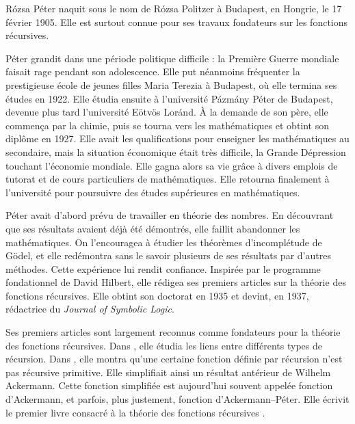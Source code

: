\documentclass[../../../include/open-logic-section]{subfiles}
\begin{document}



R\'ozsa P\'eter
naquit sous
le nom de
R\'ozsa Politzer
à Budapest,
en Hongrie,
le 17 février 1905.
Elle est surtout connue pour ses travaux fondateurs
sur les fonctions récursives.

P\'eter grandit
dans une période
politique difficile :
la Première Guerre
mondiale faisait
rage pendant
son adolescence.
Elle put néanmoins
fréquenter la
prestigieuse école
de jeunes filles
Maria Terezia
à Budapest,
où elle termina
ses études
en 1922.
Elle étudia
ensuite à
l'université
P\'azm\'any P\'eter
de Budapest,
devenue plus tard
l'université
E\"otv\"os Lor\'and.
À la demande
de son père,
elle commença
par la chimie,
puis se tourna
vers les
mathématiques
et obtint
son diplôme
en 1927.
Elle avait
les qualifications
pour enseigner
les mathématiques
au secondaire,
mais la situation
économique était
très difficile,
la Grande Dépression
touchant l'économie
mondiale. Elle
gagna alors
sa vie grâce
à divers emplois
de tutorat
et de cours
particuliers
de mathématiques.
Elle retourna
finalement à
l'université
pour poursuivre
des études
supérieures
en mathématiques.

P\'eter avait
d'abord prévu
de travailler
en théorie
des nombres.
En découvrant
que ses résultats
avaient déjà
été démontrés,
elle faillit
abandonner
les mathématiques.
On l'encouragea
à étudier les
théorèmes
d'incomplétude
de G\"odel,
et elle redémontra
sans le savoir
plusieurs de
ses résultats
par d'autres
méthodes.
Cette expérience
lui rendit
confiance.
Inspirée par
le programme
fondationnel
de David Hilbert,
elle rédigea
ses premiers articles sur la théorie
des fonctions récursives.
Elle obtint
son doctorat
en 1935 et
devint, en 1937,
rédactrice du
\emph{Journal of
Symbolic Logic}.

Ses premiers
articles sont
largement reconnus
comme fondateurs
pour la théorie
des fonctions
récursives.
Dans
\cite{Peter1935a},
elle étudia
les liens
entre différents
types de récursion.
Dans
\cite{Peter1935b},
elle montra
qu'une certaine
fonction définie
par récursion
n'est pas
récursive primitive.
Elle simplifiait
ainsi un résultat
antérieur de
Wilhelm Ackermann.
Cette fonction
simplifiée est
aujourd'hui
souvent appelée
fonction d'Ackermann,
et parfois,
plus justement,
fonction
d'Ackermann--P\'eter.
Elle écrivit
le premier
livre consacré
à la théorie
des fonctions
récursives
\citep{Peter1951}.
\end{document}
